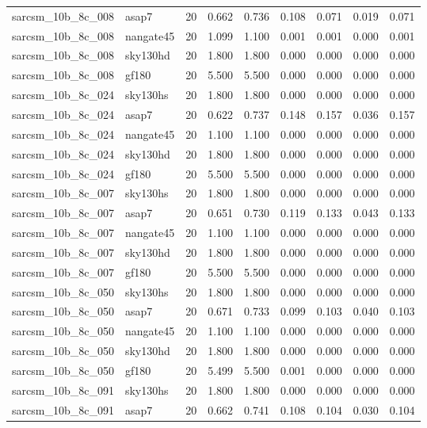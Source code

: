 \begin{tabular}{llrrrrrrr}
sarcsm\_10b\_8c\_008 & asap7 & 20 & 0.662 & 0.736 & 0.108 & 0.071 & 0.019 & 0.071 \\
sarcsm\_10b\_8c\_008 & nangate45 & 20 & 1.099 & 1.100 & 0.001 & 0.001 & 0.000 & 0.001 \\
sarcsm\_10b\_8c\_008 & sky130hd & 20 & 1.800 & 1.800 & 0.000 & 0.000 & 0.000 & 0.000 \\
sarcsm\_10b\_8c\_008 & gf180 & 20 & 5.500 & 5.500 & 0.000 & 0.000 & 0.000 & 0.000 \\
sarcsm\_10b\_8c\_024 & sky130hs & 20 & 1.800 & 1.800 & 0.000 & 0.000 & 0.000 & 0.000 \\
sarcsm\_10b\_8c\_024 & asap7 & 20 & 0.622 & 0.737 & 0.148 & 0.157 & 0.036 & 0.157 \\
sarcsm\_10b\_8c\_024 & nangate45 & 20 & 1.100 & 1.100 & 0.000 & 0.000 & 0.000 & 0.000 \\
sarcsm\_10b\_8c\_024 & sky130hd & 20 & 1.800 & 1.800 & 0.000 & 0.000 & 0.000 & 0.000 \\
sarcsm\_10b\_8c\_024 & gf180 & 20 & 5.500 & 5.500 & 0.000 & 0.000 & 0.000 & 0.000 \\
sarcsm\_10b\_8c\_007 & sky130hs & 20 & 1.800 & 1.800 & 0.000 & 0.000 & 0.000 & 0.000 \\
sarcsm\_10b\_8c\_007 & asap7 & 20 & 0.651 & 0.730 & 0.119 & 0.133 & 0.043 & 0.133 \\
sarcsm\_10b\_8c\_007 & nangate45 & 20 & 1.100 & 1.100 & 0.000 & 0.000 & 0.000 & 0.000 \\
sarcsm\_10b\_8c\_007 & sky130hd & 20 & 1.800 & 1.800 & 0.000 & 0.000 & 0.000 & 0.000 \\
sarcsm\_10b\_8c\_007 & gf180 & 20 & 5.500 & 5.500 & 0.000 & 0.000 & 0.000 & 0.000 \\
sarcsm\_10b\_8c\_050 & sky130hs & 20 & 1.800 & 1.800 & 0.000 & 0.000 & 0.000 & 0.000 \\
sarcsm\_10b\_8c\_050 & asap7 & 20 & 0.671 & 0.733 & 0.099 & 0.103 & 0.040 & 0.103 \\
sarcsm\_10b\_8c\_050 & nangate45 & 20 & 1.100 & 1.100 & 0.000 & 0.000 & 0.000 & 0.000 \\
sarcsm\_10b\_8c\_050 & sky130hd & 20 & 1.800 & 1.800 & 0.000 & 0.000 & 0.000 & 0.000 \\
sarcsm\_10b\_8c\_050 & gf180 & 20 & 5.499 & 5.500 & 0.001 & 0.000 & 0.000 & 0.000 \\
sarcsm\_10b\_8c\_091 & sky130hs & 20 & 1.800 & 1.800 & 0.000 & 0.000 & 0.000 & 0.000 \\
sarcsm\_10b\_8c\_091 & asap7 & 20 & 0.662 & 0.741 & 0.108 & 0.104 & 0.030 & 0.104 \\

\end{tabular}
